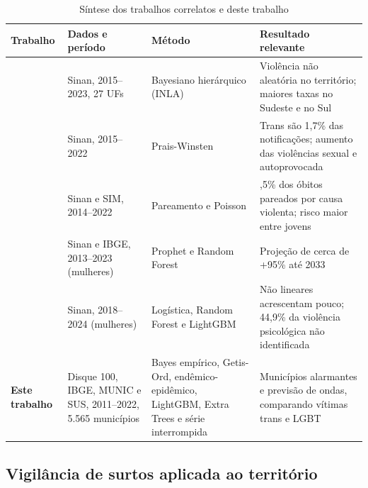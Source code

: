 \documentclass[12pt]{article}
\begin{document}
\begin{table}[!htb]
\centering
\caption{Síntese dos trabalhos correlatos e deste trabalho}
\label{tab:referencia}
{\renewcommand{\arraystretch}{1.15}\footnotesize
\begin{tabular}{>{\raggedright\arraybackslash}p{2.5cm} >{\raggedright\arraybackslash}p{3.1cm} >{\raggedright\arraybackslash}p{3.2cm} >{\raggedright\arraybackslash}p{4.4cm}}
\toprule
\textbf{Trabalho} & \textbf{Dados e período} & \textbf{Método} & \textbf{Resultado relevante} \\
\midrule
\cite{leal_silva_lizzi:2026} & Sinan, 2015--2023, 27 UFs & Bayesiano hierárquico (INLA) & Violência não aleatória no território; maiores taxas no Sudeste e no Sul \\
\addlinespace
\cite{marinho_tomazelli_firianelli:2024} & Sinan, 2015--2022 & Prais-Winsten & Trans são 1,7\% das notificações; aumento das violências sexual e autoprovocada \\
\addlinespace
\cite{luis:2025} & Sinan e SIM, 2014--2022 & Pareamento e Poisson & 42,5\% dos óbitos pareados por causa violenta; risco maior entre jovens \\
\addlinespace
\cite{coelho_jiv:2025} & Sinan e IBGE, 2013--2023 (mulheres) & Prophet e Random Forest & Projeção de cerca de +95\% até 2033 \\
\addlinespace
\cite{lucca_romero_sbbd:2026} & Sinan, 2018--2024 (mulheres) & Logística, Random Forest e LightGBM & Não lineares acrescentam pouco; 44,9\% da violência psicológica não identificada \\
\midrule
\textbf{Este trabalho} & Disque 100, IBGE, MUNIC e SUS, 2011--2022, 5.565 municípios & Bayes empírico, Getis-Ord, endêmico-epidêmico, LightGBM, Extra Trees e série interrompida & Municípios alarmantes e previsão de ondas, comparando vítimas trans e LGBT \\
\bottomrule
\end{tabular}}
\end{table}

\subsection{Vigilância de surtos aplicada ao território}
\end{document}
